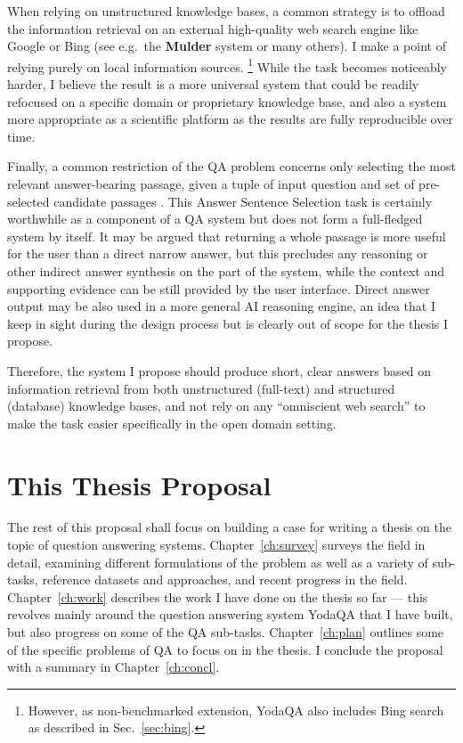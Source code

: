 When relying on unstructured knowledge bases, a common strategy is to offload
the information retrieval on an external high-quality web search engine
like Google or Bing (see e.g.\ the \textbf{Mulder} system \cite{MulderKwok}
or many others).
I make a point of relying purely on local information sources.%
\footnote{However, as non-benchmarked extension, YodaQA also includes
	Bing search as described in Sec.~\ref{sec:bing}.}
While the task becomes noticeably harder,
I believe the result is a more
universal system that could be readily refocused on a specific domain
or proprietary knowledge base, and also a system more appropriate as
a scientific platform as the results are fully reproducible over time.

Finally, a common restriction of the QA problem concerns only selecting
the most relevant answer-bearing passage, given a tuple of input question
and set of pre-selected candidate passages \cite{WangQAGrammar}.
This Answer Sentence Selection task is certainly
worthwhile as a component of a QA system but does not form a full-fledged
system by itself.
It may be argued that returning a whole passage is more useful for the user than a direct narrow answer,
but this precludes any reasoning or other indirect answer synthesis on the part of the system,
while the context and supporting evidence can be still provided by the user interface.
Direct answer output may be also used in a more general AI reasoning engine,
an idea that I keep in sight during the design process but is clearly
out of scope for the thesis I propose.

Therefore, the system I propose should produce short, clear answers
based on information retrieval from both
unstructured (full-text) and structured (database) knowledge bases,
and not rely on any ``omniscient web search'' to make the task easier
specifically in the open domain setting.

\section{This Thesis Proposal}

The rest of this proposal shall focus on building a case for writing
a thesis on the topic of question answering systems.
Chapter~\ref{ch:survey}
surveys the field in detail, examining different formulations of the problem
as well as a variety of sub-tasks, reference datasets and approaches,
and recent progress in the field.
Chapter~\ref{ch:work} describes
the work I have done on the thesis so far --- this revolves mainly around
the question answering system YodaQA that I have built, but also progress
on some of the QA sub-tasks.
Chapter~\ref{ch:plan} outlines some of the specific problems of QA
to focus on in the thesis.
I conclude the proposal with a summary in Chapter~\ref{ch:concl}.
